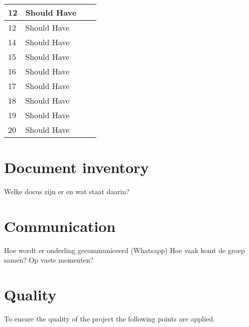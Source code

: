 \documentclass{article} %
\begin{document}
\begin{tabularx}{\textwidth}{|X|X|X|X|}
    12                   & Should Have                                    &                                                \\ \hline
    12                   & Should Have                                    &                                                \\ \hline
    14                   & Should Have                                    &                                                \\ \hline
    15                   & Should Have                                    &                                                \\ \hline
    16                   & Should Have                                    &                                                \\ \hline
    17                   & Should Have                                    &                                                \\ \hline
    18                   & Should Have                                    &                                                \\ \hline
    19                   & Should Have                                    &                                                \\ \hline
    20                   & Should Have                                    &                                                \\ \hline
\end{tabularx}
\label{tab:requirements}
\newpage

\section{Document inventory}
Welke docus zijn er en wat staat daarin?
\newpage

\section{Communication}
Hoe wordt er onderling gecommuniceerd (Whatsapp)
Hoe vaak komt de groep samen? Op vaste momenten?
\newpage

\section{Quality}
To ensure the quality of the project the following points are applied.
\end{document}
